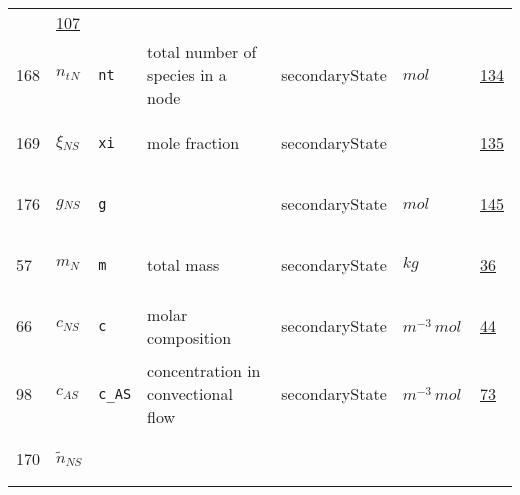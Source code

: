 \begin{longtable}{|p{1cm}|p{2.5cm}|p{4.5cm}|p{8cm}|p{3.0cm}|p{3cm}|p{1cm}|}
             &                 \hyperlink{"e:107"}{ 107 }
                 \\
            168
             & \hypertarget{"v:168"}{ $ {n_t}{_{N}} $}
             & \verb|nt|
             & total number of species in a node
             & \begin{lay}secondaryState \end{lay}
             & $ mol \, $
             &                 \hyperlink{"e:134"}{ 134 }
                 \\
            169
             & \hypertarget{"v:169"}{ $ {\xi}{_{{N S}}} $}
             & \verb|xi|
             & mole fraction
             & \begin{lay}secondaryState \end{lay}
             & $  $
             &                 \hyperlink{"e:135"}{ 135 }
                 \\
            176
             & \hypertarget{"v:176"}{ $ {g}{_{{N S}}} $}
             & \verb|g|
             & 
             & \begin{lay}secondaryState \end{lay}
             & $ mol \, $
             &                 \hyperlink{"e:145"}{ 145 }
                 \\
            57
             & \hypertarget{"v:57"}{ $ {m}{_{N}} $}
             & \verb|m|
             & total mass
             & \begin{lay}secondaryState \end{lay}
             & $ kg \, $
             &                 \hyperlink{"e:36"}{ 36 }
                 \\
            66
             & \hypertarget{"v:66"}{ $ {c}{_{{N S}}} $}
             & \verb|c|
             & molar composition
             & \begin{lay}secondaryState \end{lay}
             & $ m^{-3} \,mol \, $
             &                 \hyperlink{"e:44"}{ 44 }
                 \\
            98
             & \hypertarget{"v:98"}{ $ {c}{_{{A S}}} $}
             & \verb|c_AS|
             & concentration in convectional flow
             & \begin{lay}secondaryState \end{lay}
             & $ m^{-3} \,mol \, $
             &                 \hyperlink{"e:73"}{ 73 }
                 \\
            170
             & \hypertarget{"v:170"}{ $ {{\tilde n}}{_{{N S}}} $}

\end{longtable}
